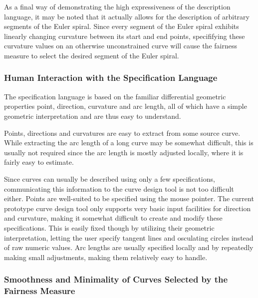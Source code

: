 \documentclass[a4paper]{article}
\begin{document}
				As a final way of demonstrating the high expressiveness of the description language, it may be noted that it actually allows for the description of arbitrary segments of the Euler spiral. Since every segment of the Euler spiral exhibits linearly changing curvature between its start and end points, specififying these curvature values on an otherwise unconstrained curve will cause the fairness measure to select the desired segment of the Euler spiral.

			\subsubsection{Human Interaction with the Specification Language}
			\label{section:human_interaction_specification_language}

				The specification language is based on the familiar differential geometric properties point, direction, curvature and arc length, all of which have a simple geometric interpretation and are thus easy to understand.

				Points, directions and curvatures are easy to extract from some source curve. While extracting the arc length of a long curve may be somewhat difficult, this is usually not required since the arc length is mostly adjusted locally, where it is fairly easy to estimate.

				Since curves can usually be described using only a few specifications, communicating this information to the curve design tool is not too difficult either. Points are well-suited to be specified using the mouse pointer. The current prototype curve design tool only supports very basic input facilities for direction and curvature, making it somewhat difficult to create and modify these specifications. This is easily fixed though by utilizing their geometric interpretation, letting the user specify tangent lines and osculating circles instead of raw numeric values. Arc lengths are usually specified locally and by repeatedly making small adjustments, making them relatively easy to handle.

			\subsubsection{Smoothness and Minimality of Curves Selected by the Fairness Measure}
			\label{section:smoothness_minimality_curves_selected_fairness_measure}

\end{document}
